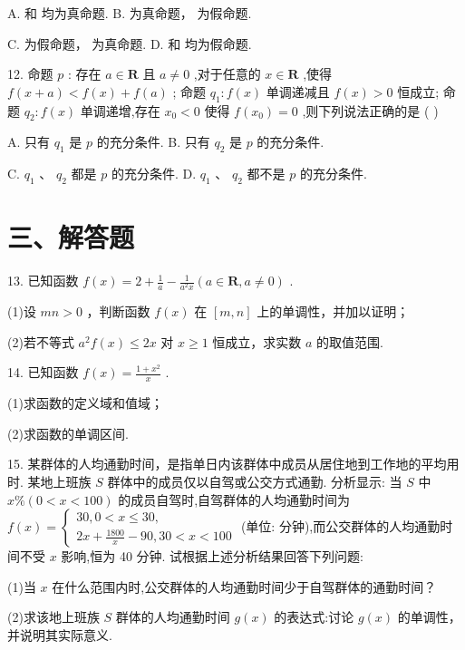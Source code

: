 A.   和  均为真命题. B.   为真命题，  为假命题.

C.   为假命题，  为真命题. D.   和  均为假命题.

12. 命题 $p$ : 存在 $a \in  \mathbf{R}$ 且 $a \neq  0$ ,对于任意的 $x \in  \mathbf{R}$ ,使得 $f\left( {x + a}\right)  < f\left( x\right)  + f\left( a\right)$ ; 命题 ${q}_{1} : f\left( x\right)$ 单调递减且 $f\left( x\right)  > 0$ 恒成立; 命题 ${q}_{2} : f\left( x\right)$ 单调递增,存在 ${x}_{0} < 0$ 使得 $f\left( {x}_{0}\right)  = 0$ ,则下列说法正确的是 ( )

A. 只有 ${q}_{1}$ 是 $p$ 的充分条件. B. 只有 ${q}_{2}$ 是 $p$ 的充分条件.

C. ${q}_{1}\text{ 、 }{q}_{2}$ 都是 $p$ 的充分条件. D. ${q}_{1}\text{ 、 }{q}_{2}$ 都不是 $p$ 的充分条件.

\section*{三、解答题}

13. 已知函数 $f\left( x\right)  = 2 + \frac{1}{a} - \frac{1}{{a}^{2}x}\left( {a \in  \mathbf{R},a \neq  0}\right)$ .

(1)设 ${mn} > 0$ ，判断函数 $f\left( x\right)$ 在 $\left\lbrack  {m,n}\right\rbrack$ 上的单调性，并加以证明；

(2)若不等式 ${a}^{2}f\left( x\right)  \leq  {2x}$ 对 $x \geq  1$ 恒成立，求实数 $a$ 的取值范围.

14. 已知函数 $f\left( x\right)  = \frac{1 + {x}^{2}}{x}$ .

(1)求函数的定义域和值域；

(2)求函数的单调区间.



15. 某群体的人均通勤时间，是指单日内该群体中成员从居住地到工作地的平均用时. 某地上班族 $S$ 群体中的成员仅以自驾或公交方式通勤. 分析显示: 当 $S$ 中 $x\% \left( {0 < x < {100}}\right)$ 的成员自驾时,自驾群体的人均通勤时间为 $f\left( x\right)  = \left\{  \begin{array}{l} {30},0 < x \leq  {30}, \\  {2x} + \frac{1800}{x} - {90},{30} < x < {100} \end{array}\right.$ (单位: 分钟),而公交群体的人均通勤时间不受 $x$ 影响,恒为 40 分钟. 试根据上述分析结果回答下列问题:

(1)当 $x$ 在什么范围内时,公交群体的人均通勤时间少于自驾群体的通勤时间？

(2)求该地上班族 $S$ 群体的人均通勤时间 $g\left( x\right)$ 的表达式:讨论 $g\left( x\right)$ 的单调性，并说明其实际意义.

